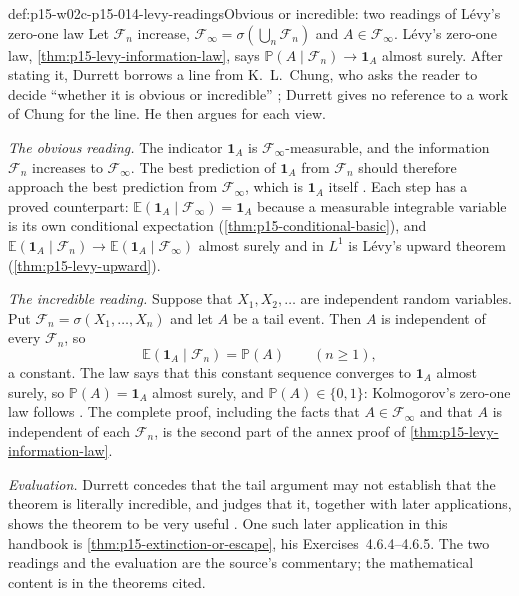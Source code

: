 \begin{hbexample}{def:p15-w02c-p15-014-levy-readings}{Obvious or incredible: two readings of L\'evy's zero-one law}
Let \(\mathcal F_n\) increase, \(\mathcal F_\infty=\sigma(\bigcup_n\mathcal F_n)\)
and \(A\in\mathcal F_\infty\). L\'evy's zero-one law,
\cref{thm:p15-levy-information-law}, says
\(\mathbb P(A\mid\mathcal F_n)\to\mathbf1_A\) almost surely. After
stating it, Durrett borrows a line from K.~L.~Chung, who asks the reader
to decide ``whether it is obvious or incredible''
\cite[p.~247]{DurrettPTEAuthor2019}; Durrett gives no reference to a
work of Chung for the line. He then argues for each view.

\emph{The obvious reading.} The indicator \(\mathbf1_A\) is
\(\mathcal F_\infty\)-measurable, and the information \(\mathcal F_n\)
increases to \(\mathcal F_\infty\). The best prediction of
\(\mathbf1_A\) from \(\mathcal F_n\) should therefore approach the best
prediction from \(\mathcal F_\infty\), which is \(\mathbf1_A\) itself
\cite[p.~247]{DurrettPTEAuthor2019}. Each step has a proved counterpart:
\(\mathbb E(\mathbf1_A\mid\mathcal F_\infty)=\mathbf1_A\) because a
measurable integrable variable is its own conditional expectation
(\cref{thm:p15-conditional-basic}), and
\(\mathbb E(\mathbf1_A\mid\mathcal F_n)\to\mathbb E(\mathbf1_A\mid\mathcal F_\infty)\)
almost surely and in \(L^1\) is L\'evy's upward theorem
(\cref{thm:p15-levy-upward}).

\emph{The incredible reading.} Suppose that \(X_1,X_2,\ldots\) are
independent random variables. Put
\(\mathcal F_n=\sigma(X_1,\ldots,X_n)\) and let \(A\) be a tail event.
Then \(A\) is independent of every \(\mathcal F_n\), so
\[
 \mathbb E(\mathbf1_A\mid\mathcal F_n)=\mathbb P(A)\qquad(n\geq1),
\]
a constant. The law says that this constant sequence converges to
\(\mathbf1_A\) almost surely, so \(\mathbb P(A)=\mathbf1_A\) almost
surely, and \(\mathbb P(A)\in\{0,1\}\): Kolmogorov's zero-one law
follows \cite[pp.~247--248]{DurrettPTEAuthor2019}. The complete proof,
including the facts that \(A\in\mathcal F_\infty\) and that \(A\) is
independent of each \(\mathcal F_n\), is the second part of the annex
proof of \cref{thm:p15-levy-information-law}.

\emph{Evaluation.} Durrett concedes that the tail argument may not
establish that the theorem is literally incredible, and judges that it, together with later applications, shows the theorem to
be very useful \cite[p.~248]{DurrettPTEAuthor2019}. One such later
application in this handbook is
\cref{thm:p15-extinction-or-escape}, his Exercises~4.6.4--4.6.5. The
two readings and the evaluation are the source's commentary; the
mathematical content is in the theorems cited.
\end{hbexample}

